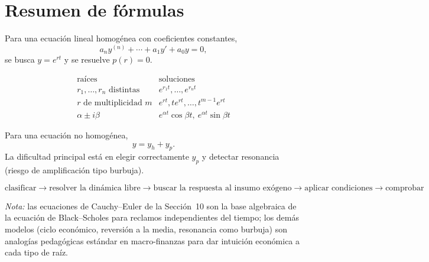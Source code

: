 \documentclass[11pt]{article}
\theoremstyle{definition}
\begin{document}
\section*{Resumen de fórmulas}

Para una ecuación lineal homogénea con coeficientes constantes,
\[
a_ny^{(n)}+\cdots+a_1y'+a_0y=0,
\]
se busca $y=e^{rt}$ y se resuelve $p(r)=0$.

\[
\begin{array}{c|c}
\text{raíces} & \text{soluciones}\\
\hline
r_1,\ldots,r_n\text{ distintas} & e^{r_1t},\ldots,e^{r_nt}\\
r\text{ de multiplicidad }m & e^{rt},te^{rt},\ldots,t^{m-1}e^{rt}\\
\alpha\pm i\beta & e^{\alpha t}\cos\beta t,\ e^{\alpha t}\sin\beta t
\end{array}
\]

Para una ecuación no homogénea,
\[
\boxed{y=y_h+y_p}.
\]
La dificultad principal está en elegir correctamente $y_p$ y detectar resonancia
(riesgo de amplificación tipo burbuja).

\[
\boxed{
\text{clasificar}
\longrightarrow
\text{resolver la dinámica libre}
\longrightarrow
\text{buscar la respuesta al insumo exógeno}
\longrightarrow
\text{aplicar condiciones}
\longrightarrow
\text{comprobar}
}
\]

\vspace{8pt}
{\small\color{upblue}\emph{Nota:} las ecuaciones de Cauchy--Euler de la Sección~10
son la base algebraica de la ecuación de Black--Scholes para reclamos independientes
del tiempo; los demás modelos (ciclo económico, reversión a la media, resonancia como
burbuja) son analogías pedagógicas estándar en macro-finanzas para dar intuición
económica a cada tipo de raíz.}
\end{document}
